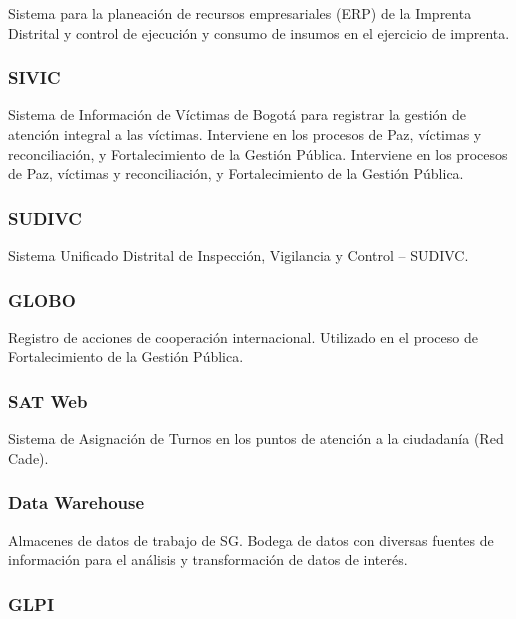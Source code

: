 \documentclass[
	a4paper, %
	12pt, %
]{include/CSSullivanBusinessReport}
\begin{document}
Sistema para la planeación de recursos empresariales (ERP) de la
Imprenta Distrital y control de ejecución y consumo de insumos en el
ejercicio de imprenta.

\subsubsection{SIVIC}\label{sec:sivic}

Sistema de Información de Víctimas de Bogotá para registrar la gestión
de atención integral a las víctimas. Interviene en los procesos de Paz,
víctimas y reconciliación, y Fortalecimiento de la Gestión Pública.
Interviene en los procesos de Paz, víctimas y reconciliación, y
Fortalecimiento de la Gestión Pública.

\subsubsection{SUDIVC}\label{sec:sudivc}

Sistema Unificado Distrital de Inspección, Vigilancia y Control --
SUDIVC.

\subsubsection{GLOBO}\label{sec:globo}

Registro de acciones de cooperación internacional. Utilizado en el
proceso de Fortalecimiento de la Gestión Pública.

\subsubsection{SAT Web}\label{sec:sat-web}

Sistema de Asignación de Turnos en los puntos de atención a la
ciudadanía (Red Cade).

\subsubsection{Data Warehouse}\label{sec:data-warehouse}

Almacenes de datos de trabajo de SG. Bodega de datos con diversas
fuentes de información para el análisis y transformación de datos de
interés.

\subsubsection{GLPI}\label{sec:glpi}
\end{document}
